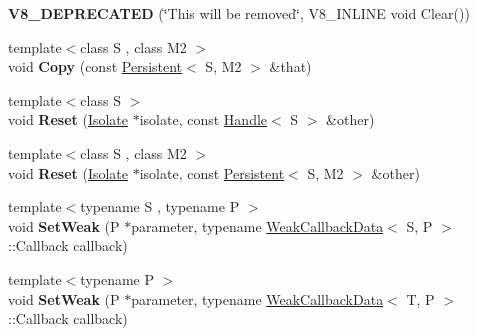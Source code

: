 \begin{DoxyCompactItemize}
\item 
\hypertarget{classv8_1_1_persistent_af776992b2486ea731e92ffc059b02a08}{}{\bfseries V8\+\_\+\+D\+E\+P\+R\+E\+C\+A\+T\+E\+D} (\char`\"{}This will be removed\char`\"{}, V8\+\_\+\+I\+N\+L\+I\+N\+E void Clear())\label{classv8_1_1_persistent_af776992b2486ea731e92ffc059b02a08}

\item 
\hypertarget{classv8_1_1_persistent_ace50a178e3b772f75611e22e41fae974}{}{\footnotesize template$<$class S , class M2 $>$ }\\void {\bfseries Copy} (const \hyperlink{classv8_1_1_persistent}{Persistent}$<$ S, M2 $>$ \&that)\label{classv8_1_1_persistent_ace50a178e3b772f75611e22e41fae974}

\item 
\hypertarget{classv8_1_1_persistent_abe81d9e008a4becee09bcc531786eda4}{}{\footnotesize template$<$class S $>$ }\\void {\bfseries Reset} (\hyperlink{classv8_1_1_isolate}{Isolate} $\ast$isolate, const \hyperlink{classv8_1_1_handle}{Handle}$<$ S $>$ \&other)\label{classv8_1_1_persistent_abe81d9e008a4becee09bcc531786eda4}

\item 
\hypertarget{classv8_1_1_persistent_ab60cedeaccb2d37ab270e8b67a4668e3}{}{\footnotesize template$<$class S , class M2 $>$ }\\void {\bfseries Reset} (\hyperlink{classv8_1_1_isolate}{Isolate} $\ast$isolate, const \hyperlink{classv8_1_1_persistent}{Persistent}$<$ S, M2 $>$ \&other)\label{classv8_1_1_persistent_ab60cedeaccb2d37ab270e8b67a4668e3}

\item 
\hypertarget{classv8_1_1_persistent_ab828a612fde16d07c48909266912bb9b}{}{\footnotesize template$<$typename S , typename P $>$ }\\void {\bfseries Set\+Weak} (P $\ast$parameter, typename \hyperlink{classv8_1_1_weak_callback_data}{Weak\+Callback\+Data}$<$ S, P $>$\+::Callback callback)\label{classv8_1_1_persistent_ab828a612fde16d07c48909266912bb9b}

\item 
\hypertarget{classv8_1_1_persistent_af7837e06a2fbed3bdb2cc83f3b953ec7}{}{\footnotesize template$<$typename P $>$ }\\void {\bfseries Set\+Weak} (P $\ast$parameter, typename \hyperlink{classv8_1_1_weak_callback_data}{Weak\+Callback\+Data}$<$ T, P $>$\+::Callback callback)\label{classv8_1_1_persistent_af7837e06a2fbed3bdb2cc83f3b953ec7}

\end{DoxyCompactItemize}
